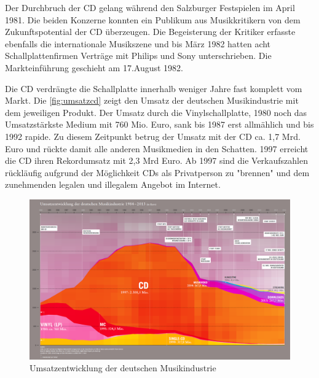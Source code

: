 Der Durchbruch der CD gelang während den Salzburger Festspielen im April 1981.
Die beiden Konzerne konnten ein Publikum aus Musikkritikern von dem
Zukunftspotential der CD überzeugen. Die Begeisterung der Kritiker erfasste
ebenfalls die internationale Musikszene und bis März 1982 hatten acht
Schallplattenfirmen Verträge mit Philips und Sony unterschrieben. Die
Markteinführung geschieht am 17.August 1982. \cite{cuz}

Die CD verdrängte die Schallplatte innerhalb weniger Jahre fast komplett vom
Markt. Die \autoref{fig:umsatzcd} zeigt den Umsatz der deutschen Musikindustrie
mit dem jeweiligen Produkt. Der Umsatz durch die Vinylschallplatte, 1980 noch
das Umsatzstärkste Medium mit 760 Mio. Euro, sank bis 1987 erst allmählich und
bis 1992 rapide. Zu diesem Zeitpunkt betrug der Umsatz mit der CD ca. 1,7 Mrd.
Euro und rückte damit alle anderen Musikmedien in den Schatten. 1997 erreicht
die CD ihren Rekordumsatz mit 2,3 Mrd Euro. Ab 1997 sind die Verkaufszahlen
rückläufig aufgrund der Möglichkeit CDs als Privatperson zu
"brennen" und dem zunehmenden legalen und
illegalem Angebot im Internet.

\begin{figure}[h]
    \begin{center}
        \begin{minipage}[t]{\textwidth}
            \begin{center}
                \includegraphics[width=\textwidth]{Bilder/Optische_Datentraeger_Die_Compact_Disc/Geschichte/umsatzcd.png}
                \caption[Umsatzentwicklung der deutschen Musikindustrie \newline \url{http://www.musikindustrie.de/uploads/media/140325\_BVMI\_2013\_Jahrbuch\_ePaper\_V02.pdf} S. 7 (zuletzt aufgerufen am 03.08.2015)]{Umsatzentwicklung der deutschen Musikindustrie}
                \label{fig:umsatzcd}
            \end{center}
        \end{minipage}
    \end{center}
\end{figure}

